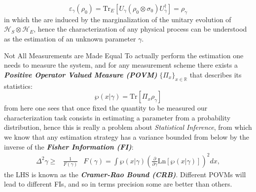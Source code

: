 \documentclass[final]{beamer}
\newlength{\colwidth}
\begin{document}
\begin{frame}[t]
\begin{columns}[t]
\begin{column}{\colwidth}
  
\vspace{-0.2\linewidth}
{\LARGE
  \begin{equation*}
       \varepsilon_{\gamma}\left(\rho_{0}\right)=\mathrm{Tr}_{E}\left[ U_{\gamma}\left( \rho_{0} \otimes \sigma_{0} \right)U_{\gamma}^{\dagger}\right]=\rho_{\gamma}
  \end{equation*}
}
in which the  are induced by the marginalization of the unitary evolution of
$\mathcal{H}_{S}\otimes\mathcal{H}_{E}$, hence the characterization of any physical process can be understood as the estimation of an unknown parameter $\gamma$.
  \begin{block}{Not All Measurements are Made Equal}
    To actually perform the estimation one needs to measure the system, and for any measurement scheme there exists a \textbf{\textit{Positive
      Operator Valued Measure (POVM)}} $\{\Pi_{x}\}_{x \in \mathbb{R}}$ that describes its statistics:
{\LARGE
  \begin{equation*}
     \wp(x | \gamma)= \mathrm{Tr}\left[\Pi_{x} \rho_{\gamma}\right]
  \end{equation*}
}
from here one sees that once fixed the quantity to be measured our characterization task consists in estimating a parameter from a probability
distribution, hence this is really a problem about \textit{Statistical Inference}, from which we know that any estimation strategy has a variance
bounded from below by the inverse of the \textit{\textbf{Fisher Information (FI)}}:
{\Large
  \begin{align*}
    \Delta^{2}\gamma \geq & \frac{1}{F(\gamma)} & F(\gamma) = \int  \wp(x | \gamma) \left(\frac{\partial}{\partial\gamma} \mathrm{Ln}  [\wp(x |\gamma)]\right)^{2} dx,
  \end{align*}
}
the LHS is known as the \textit{\textbf{Cramer-Rao Bound (CRB)}}. Different POVMs will lead to different FIs, and so in terms precision some
are better than others.
\end{block}


\end{column}
\end{columns}
\end{frame}
\end{document}
